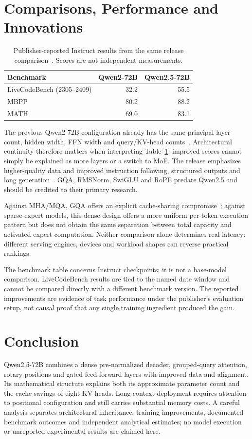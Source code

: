 \documentclass[conference]{IEEEtran}
\begin{document}
\section{Comparisons, Performance and Innovations}
\begin{table}[t]
\caption{Publisher-reported Instruct results from the same release comparison~\cite{blog}. Scores are not independent measurements.}
\centering\small
\begin{tabular}{lrr}\toprule
Benchmark & Qwen2-72B & Qwen2.5-72B\\\midrule
LiveCodeBench (2305--2409) & 32.2 & 55.5\\
MBPP & 80.2 & 88.2\\
MATH & 69.0 & 83.1\\\bottomrule
\end{tabular}
\label{tab:bench}
\end{table}

The previous Qwen2-72B configuration already has the same principal layer count, hidden width, FFN width and query/KV-head counts~\cite{prev}. Architectural continuity therefore matters when interpreting Table~\ref{tab:bench}: improved scores cannot simply be explained as more layers or a switch to MoE. The release emphasizes higher-quality data and improved instruction following, structured outputs and long generation~\cite{blog}. GQA, RMSNorm, SwiGLU and RoPE predate Qwen2.5 and should be credited to their primary research.

Against MHA/MQA, GQA offers an explicit cache-sharing compromise~\cite{gqa}; against sparse-expert models, this dense design offers a more uniform per-token execution pattern but does not obtain the same separation between total capacity and activated expert computation. Neither comparison alone determines real latency: different serving engines, devices and workload shapes can reverse practical rankings.

The benchmark table concerns Instruct checkpoints; it is not a base-model comparison. LiveCodeBench results are tied to the named date window and cannot be compared directly with a different benchmark version. The reported improvements are evidence of task performance under the publisher's evaluation setup, not causal proof that any single training ingredient produced the gain.

\section{Conclusion}
Qwen2.5-72B combines a dense pre-normalized decoder, grouped-query attention, rotary positions and gated feed-forward layers with improved data and alignment. Its mathematical structure explains both its approximate parameter count and the cache savings of eight KV heads. Long-context deployment requires attention to positional configuration and still carries substantial memory costs. A careful analysis separates architectural inheritance, training improvements, documented benchmark outcomes and independent analytical estimates; no model execution or unreported experimental results are claimed here.
\end{document}
